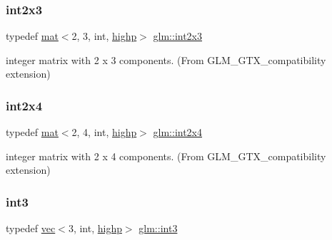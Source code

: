 \subsubsection{\texorpdfstring{int2x3}{int2x3}}
{\footnotesize\ttfamily typedef \hyperlink{structglm_1_1mat}{mat}$<$2, 3, int, \hyperlink{namespaceglm_a36ed105b07c7746804d7fdc7cc90ff25ac6f7eab42eacbb10d59a58e95e362074}{highp}$>$ \hyperlink{group__gtx__compatibility_ga13c7e3ba6d19765d8877cccf05c2e520}{glm\+::int2x3}}



integer matrix with 2 x 3 components. (From G\+L\+M\+\_\+\+G\+T\+X\+\_\+compatibility extension) 

\mbox{\label{group__gtx__compatibility_gab5fea62bdc861a2b0dd5ae6147b88975}} 
\subsubsection{\texorpdfstring{int2x4}{int2x4}}
{\footnotesize\ttfamily typedef \hyperlink{structglm_1_1mat}{mat}$<$2, 4, int, \hyperlink{namespaceglm_a36ed105b07c7746804d7fdc7cc90ff25ac6f7eab42eacbb10d59a58e95e362074}{highp}$>$ \hyperlink{group__gtx__compatibility_gab5fea62bdc861a2b0dd5ae6147b88975}{glm\+::int2x4}}



integer matrix with 2 x 4 components. (From G\+L\+M\+\_\+\+G\+T\+X\+\_\+compatibility extension) 

\mbox{\label{group__gtx__compatibility_ga90dda63e632aac169a8796ac06ff9de2}} 
\subsubsection{\texorpdfstring{int3}{int3}}
{\footnotesize\ttfamily typedef \hyperlink{structglm_1_1vec}{vec}$<$3, int, \hyperlink{namespaceglm_a36ed105b07c7746804d7fdc7cc90ff25ac6f7eab42eacbb10d59a58e95e362074}{highp}$>$ \hyperlink{group__gtx__compatibility_ga90dda63e632aac169a8796ac06ff9de2}{glm\+::int3}}




